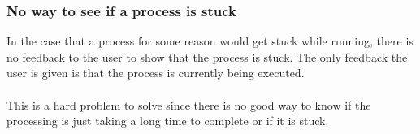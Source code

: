 \subsubsection{No way to see if a process is stuck}
In the case that a process for some reason would get stuck while running, there is no feedback to the user to show that the process is stuck. The only feedback the user is given is that the process is currently being executed.\\
\\
This is a hard problem to solve since there is no good way to know if the processing is just taking a long time to complete or if it is stuck.
